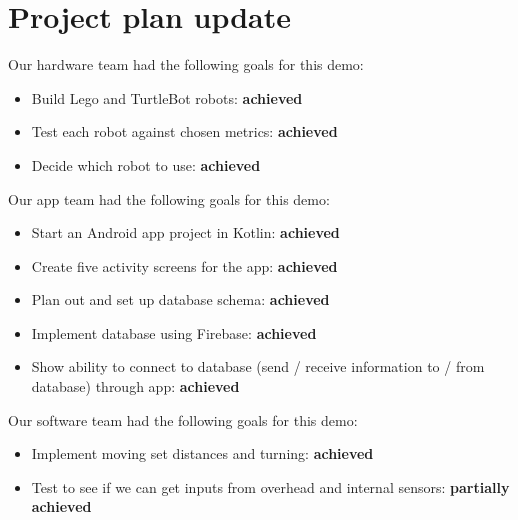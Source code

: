 \documentclass{article}
\begin{document}
 



\begin{abstract}
  {\it Tadashi} is an assistive robot to automate simple tasks within a healthcare environment: waking patients up, bringing food and water to patients at specified times, and checking on the welfare of patients when needed. 

  In this demo we will demonstrate remote control of movement and turning for the TurtleBot; as well as the ability to recognize objects in its path using the built-in Lidar sensor. We will demonstrate the Lego robot we built, although after testing we have decided to proceed with the TurtleBot. We will also demonstrate a skeleton Android app allowing for basic interaction with a database.
\end{abstract} 

\section{Project plan update} 
Our hardware team had the following goals for this demo:
\begin{itemize}
\item Build Lego and TurtleBot robots: {\bf achieved}
\item Test each robot against chosen metrics: {\bf achieved}
\item Decide which robot to use: {\bf achieved}
\end{itemize}

Our app team had the following goals for this demo:
\begin{itemize}
\item Start an Android app project in Kotlin: {\bf achieved}
\item Create five activity screens for the app: {\bf achieved}
\item Plan out and set up database schema: {\bf achieved}
\item Implement database using Firebase: {\bf achieved}
\item Show ability to connect to database (send / receive information to / from database) through app: {\bf achieved}
\end{itemize}

Our software team had the following goals for this demo:
\begin{itemize}
\item Implement moving set distances and turning: {\bf achieved}
\item Test to see if we can get inputs from overhead and internal sensors: {\bf partially achieved}
\end{itemize}
\end{document}
